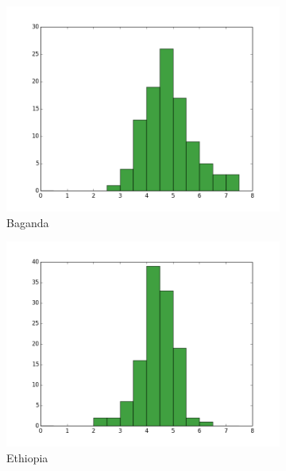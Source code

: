 \begin{figure}[htp]
\begin{subfigure}{.3\textwidth}
  \centering
  \includegraphics[width=1.0\linewidth]{fig/coverage_baganda.png}
  \caption{Baganda}
\end{subfigure}
\begin{subfigure}{.3\textwidth}
  \centering
  \includegraphics[width=1.0\linewidth]{fig/coverage_ethiopia.png}
  \caption{Ethiopia}
\end{subfigure}
\begin{subfigure}{.3\textwidth}
  \centering

\end{subfigure}
\end{figure}

